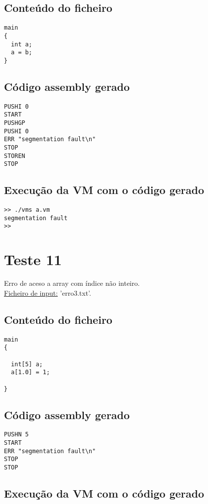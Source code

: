 \documentclass[11pt,a4paper]{report}%
\begin{document}
\subsection{Conteúdo do ficheiro}

\begin{verbatim}
main
{
  int a;
  a = b;  
}
\end{verbatim}


\subsection{Código assembly gerado}
\begin{verbatim}
PUSHI 0
START
PUSHGP
PUSHI 0
ERR "segmentation fault\n"
STOP
STOREN
STOP
\end{verbatim}


\subsection{Execução da VM com o código gerado}

\begin{verbatim}
>> ./vms a.vm
segmentation fault
>>
\end{verbatim}

\section{Teste 11}
Erro de aceso a array com índice não inteiro. \\
\underline{Ficheiro de input:} 'erro3.txt'.

\subsection{Conteúdo do ficheiro}

\begin{verbatim}
main
{

  int[5] a;
  a[1.0] = 1;

}
\end{verbatim}


\subsection{Código assembly gerado}
\begin{verbatim}
PUSHN 5
START
ERR "segmentation fault\n"
STOP
STOP
\end{verbatim}


\subsection{Execução da VM com o código gerado}
\end{document}

